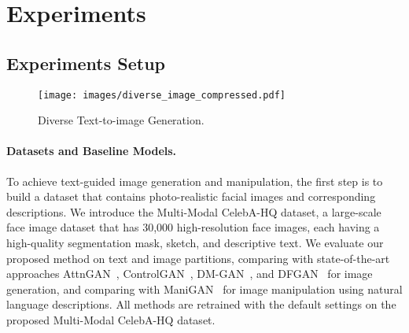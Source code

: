 \documentclass[final]{cvpr}
\begin{document}
\section{Experiments}
\label{sec:experiments}

\subsection{Experiments Setup}
\label{subsec:setup}

\begin{figure}[th]
\texttt{[image: images/diverse\_image\_compressed.pdf]}
\centering
\caption{Diverse Text-to-image Generation.}
\label{fig:diverse_image}
\end{figure}

\begin{table}[th]
\centering
\caption{{Quantitative Comparison of Text-to-Image Generation.} We use FID, LPIPS, accuracy (Acc.), and realism (Real.) to compare the state of the art and our method on the proposed Multi-modal CelebA-HQ dataset.  means the lower the better while  means the opposite.}
\label{tab:quan_gen}
\end{table}

\paragraph{Datasets and Baseline Models.}
To achieve text-guided image generation and manipulation, the first step is to build a dataset that contains photo-realistic facial images and corresponding descriptions. 
We introduce the Multi-Modal CelebA-HQ dataset, a large-scale face image dataset that has 30,000 high-resolution face images, each having a high-quality segmentation mask, sketch, and descriptive text. 
We evaluate our proposed method on text and image partitions, comparing with state-of-the-art approaches AttnGAN~\cite{xu2018attngan}, ControlGAN~\cite{li2019control}, DM-GAN~\cite{zhu2019dmgan}, and DFGAN~\cite{tao2020dfgan} for image generation, and comparing with ManiGAN~\cite{li2020manigan} for image manipulation using natural language descriptions. 
All methods are retrained with the default settings on the proposed Multi-Modal CelebA-HQ dataset.
\end{document}
